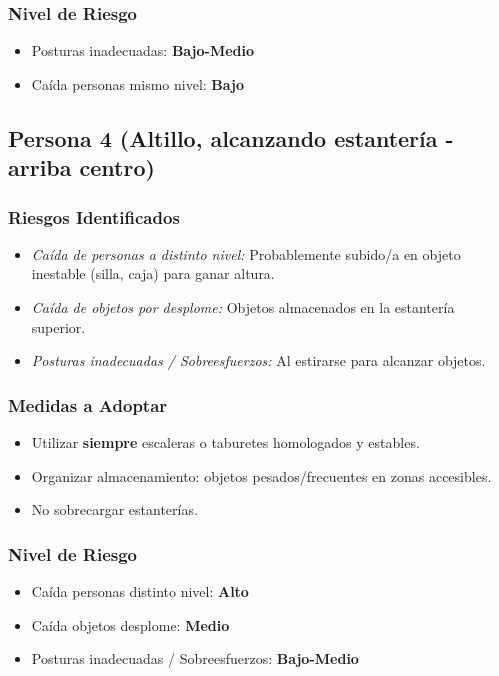 \documentclass[12pt,a4paper]{article}
\begin{document}
	\subsubsection{Nivel de Riesgo}
	\begin{itemize}
		\item Posturas inadecuadas: \textbf{Bajo-Medio}
		\item Caída personas mismo nivel: \textbf{Bajo}
	\end{itemize}
	
	\bigskip\hrulefill\bigskip
	
	\subsection{Persona 4 (Altillo, alcanzando estantería - arriba centro)}
	
	\subsubsection{Riesgos Identificados}
	\begin{itemize}
		\item \textit{Caída de personas a distinto nivel:} Probablemente subido/a en objeto inestable (silla, caja) para ganar altura.
		\item \textit{Caída de objetos por desplome:} Objetos almacenados en la estantería superior.
		\item \textit{Posturas inadecuadas / Sobreesfuerzos:} Al estirarse para alcanzar objetos.
	\end{itemize}
	
	\subsubsection{Medidas a Adoptar}
	\begin{itemize}
		\item Utilizar \textbf{siempre} escaleras o taburetes homologados y estables.
		\item Organizar almacenamiento: objetos pesados/frecuentes en zonas accesibles.
		\item No sobrecargar estanterías.
	\end{itemize}
	
	\subsubsection{Nivel de Riesgo}
	\begin{itemize}
		\item Caída personas distinto nivel: \textbf{Alto}
		\item Caída objetos desplome: \textbf{Medio}
		\item Posturas inadecuadas / Sobreesfuerzos: \textbf{Bajo-Medio}
	\end{itemize}
	
\end{document}
